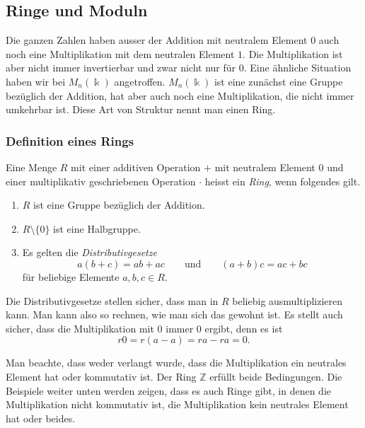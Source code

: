 %
%
%
\subsection{Ringe und Moduln
\label{buch:grundlagen:subsection:ringe}}
Die ganzen Zahlen haben ausser der Addition mit neutralem Element $0$
auch noch eine Multiplikation mit dem neutralen Element $1$.
Die Multiplikation ist aber nicht immer invertierbar und zwar
nicht nur für $0$.
Eine ähnliche Situation haben wir bei $M_n(\Bbbk)$ angetroffen.
$M_n(\Bbbk)$ ist eine zunächst eine Gruppe bezüglich der Addition,
hat aber auch noch eine Multiplikation, die nicht immer umkehrbar ist.
Diese Art von Struktur nennt man einen Ring.

\subsubsection{Definition eines Rings}

\begin{definition}
%
Eine Menge $R$ mit einer additiven Operation $+$ mit neutralem Element
$0$ und einer multiplikativ geschriebenen Operation $\cdot$ heisst ein
{\em Ring}, wenn folgendes gilt.
%
\begin{enumerate}
\item
$R$ ist eine Gruppe bezüglich der Addition.
\item
$R\setminus\{0\}$ ist eine Halbgruppe.
\item
Es gelten die {\em Distributivgesetze}
\[
a(b+c)=ab+ac
\qquad\text{und}\qquad
(a+b)c=ac+bc
\]
für beliebige Elemente $a,b,c\in R$.
%
\end{enumerate}
\end{definition}

Die Distributivgesetze stellen sicher, dass man in $R$ beliebig
ausmultiplizieren kann.
Man kann also so rechnen, wie man sich das gewohnt ist.
Es stellt auch sicher, dass die Multiplikation mit $0$ immer $0$
ergibt, denn es ist
\[
r0 = r(a-a) = ra-ra=0.
\]

Man beachte, dass weder verlangt wurde, dass die Multiplikation
ein neutrales Element hat oder kommutativ ist.
Der Ring $\mathbb{Z}$ erfüllt beide Bedingungen.
Die Beispiele weiter unten werden zeigen, dass es auch Ringe gibt,
in denen die Multiplikation nicht kommutativ ist, die Multiplikation
kein neutrales Element hat oder beides.

